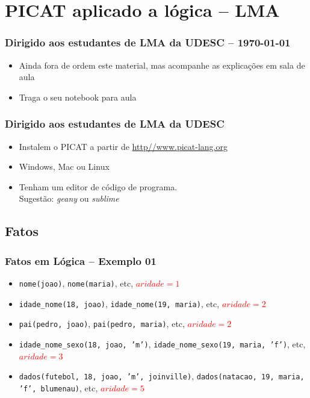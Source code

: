 \documentclass[10pt]{beamer}
\begin{document}

\section{PICAT aplicado a lógica -- LMA}
\begin{frame}
    \frametitle{Dirigido aos estudantes de LMA da UDESC -- \today}
    \begin{itemize}
    \item Ainda fora de ordem este material, mas acompanhe as explicações
    em sala de aula
    
    \item Traga o seu notebook para aula
    
    \end{itemize}
\end{frame}


\begin{frame}[fragile]
    \frametitle{Dirigido aos estudantes de LMA da UDESC}
    \begin{itemize}
    \item Instalem o PICAT a partir de \url{http//www.picat-lang.org}
    \item Windows, Mac ou Linux
    \item Tenham um editor de código de programa.\\
     Sugestão: \textit{geany} ou \textit{sublime}
    \end{itemize}
\end{frame}


\subsection{Fatos}
\begin{frame}
    \frametitle{Fatos em Lógica  -- Exemplo 01}
    \begin{itemize}
    \item \texttt{nome(joao)}, \texttt{nome(maria)}, etc, \textcolor{red}{$aridade=1$} 
    \item \texttt{idade\_nome(18, joao)}, \texttt{idade\_nome(19, maria)}, etc, \textcolor{red}{$aridade=2$}
    \item \texttt{pai(pedro, joao)}, \texttt{pai(pedro, maria)}, etc, \textcolor{red}{$aridade=2$}
    \item \texttt{idade\_nome\_sexo(18, joao, 'm')}, \texttt{idade\_nome\_sexo(19, maria, 'f')}, etc, \textcolor{red}{$aridade=3$}
    \item \texttt{dados(futebol, 18, joao, 'm', joinville)}, \texttt{dados(natacao, 19, maria, 'f', blumenau)}, etc, \textcolor{red}{$aridade=5$}
    \end{itemize}
\end{frame}
\end{document}
